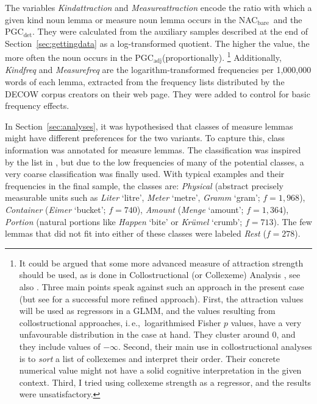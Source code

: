 \documentclass[USenglish]{article}
\newcommand{\ie}{i.\,e.,}
\newcommand{\Sub}[1]{\ensuremath{\mathrm{_{#1}}}}
\newcommand{\NACb}{NAC\Sub{bare}}
\newcommand{\PGCd}{PGC\Sub{det}}
\newcommand{\PGCa}{PGC\Sub{adj}}
\begin{document}
The variables \textit{Kindattraction} and \textit{Measureattraction} encode the ratio with which a given kind noun lemma or measure noun lemma occurs in the \NACb\ and the \PGCd.
They were calculated from the auxiliary samples described at the end of Section~\ref{sec:gettingdata} as a log-transformed quotient.
The higher the value, the more often the noun occurs in the \PGCa (proportionally).%
\footnote{
  It could be argued that some more advanced measure of attraction strength should be used, as is done in Collostructional (or Collexeme) Analysis \citep{GriesStefanowitsch2004}, see also \cite{Gries2015a}.
  Three main points speak against such an approach in the present case (but see \citealp[246--249]{Levshina2016} for a successful more refined approach).
  First, the attraction values will be used as regressors in a GLMM, and the values resulting from collostructional approaches, \ie\ logarithmised Fisher $p$ values, have a very unfavourable distribution in the case at hand.
  They cluster around $0$, and they include values of $-\infty$.
  Second, their main use in collostructional analyses is to \textit{sort} a list of collexemes and interpret their order.
  Their concrete numerical value might not have a solid cognitive interpretation in the given context.
  Third, I tried using collexeme strength as a regressor, and the results were unsatisfactory.
}
Additionally, \textit{Kindfreq} and \textit{Measurefreq} are the logarithm-transformed frequencies per 1,000,000 words of each lemma, extracted from the frequency lists distributed by the DECOW corpus creators on their web page.
They were added to control for basic frequency effects.

In Section~\ref{sec:analyses}, it was hypothesised that classes of measure lemmas might have different preferences for the two variants.
To capture this, class information was annotated for measure lemmas.
The classification was inspired by the list in \cite[530]{Koptjevskaja2001}, but due to the low frequencies of many of the potential classes, a very coarse classification was finally used.
With typical examples and their frequencies in the final sample, the classes are:
\textit{Physical} (abstract precisely measurable units such as \textit{Liter} `litre', \textit{Meter} `metre', \textit{Gramm} `gram'; $f=1,968$),
\textit{Container} (\textit{Eimer} `bucket'; $f=740$), 
\textit{Amount} (\textit{Menge} `amount'; $f=1,364$), 
\textit{Portion} (natural portions like \textit{Happen} `bite' or \textit{Krümel} `crumb'; $f=713$).
The few lemmas that did not fit into either of these classes were labeled \textit{Rest} ($f=278$).
\end{document}
